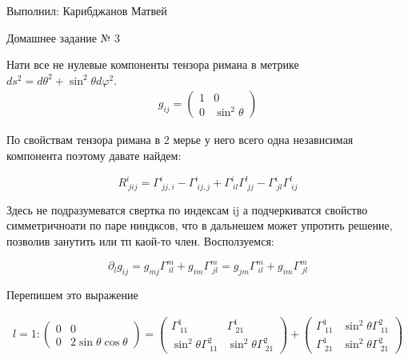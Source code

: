 \documentclass[a4paper]{article}
\renewcommand{\phi}{\varphi}
\numberwithin{equation}{section}
\begin{document}
\begin{flushright}
    Выполнил:
    Карибджанов Матвей

    Домашнее задание № 3
\end{flushright}
\pagestyle{main}

Нати все не нулевые компоненты тензора римана в метрике 
$ds^2 = d\theta^2 + \sin^2 \theta d\phi^2$.
\begin{gather}
    g_{ij} = 
    \begin{pmatrix}
        1 & 0 \\
        0 & \sin^2 \theta
    \end{pmatrix}
\end{gather}

По свойствам тензора римана в 2 мерье у него 
всего одна независимая компонента поэтому давате найдем:

\begin{equation}
    \label{eq_riman}
    R^i_{\ jij} = \Gamma^{i}_{\ jj,i} - \Gamma^{i}_{\ ij,j} 
    + \Gamma^{i}_{\ il}\Gamma^{l}_{\ jj} 
    - \Gamma^{i}_{\ jl}\Gamma^{l}_{\ ij}
\end{equation}

Здесь не подразумеватся свертка по индексам ij а подчеркиватся свойство 
симметричноати по паре ниндксов, что в дальнешем может упротить решение,
позволив занутить или тп каой-то член. Восползуемся:

\begin{equation}
    \partial_l g_{ij} = g_{mj} \Gamma^m_{\ il} + g_{im} \Gamma^m_{\ jl} 
    = g_{jm} \Gamma^m_{\ il} + g_{im} \Gamma^m_{\ jl}
\end{equation}

Перепишем это выражение

\begin{gather}
    \label{eq_l1}
    l = 1: 
    \begin{pmatrix}
        0 & 0 \\
        0 & 2 \sin \theta \cos \theta
    \end{pmatrix}
    = 
    \begin{pmatrix}
        \Gamma^1_{\ 11} & \Gamma^1_{\ 21} \\
        \sin^2 \theta \Gamma^2_{\ 11} & \sin^2 \theta \Gamma^2_{\ 21}
    \end{pmatrix}
    + 
    \begin{pmatrix}
        \Gamma^1_{\ 11} & \sin^2 \theta \Gamma^2_{\ 11}  \\
        \Gamma^1_{\ 21} & \sin^2 \theta \Gamma^2_{\ 21}
    \end{pmatrix}
\end{gather}
\end{document}
